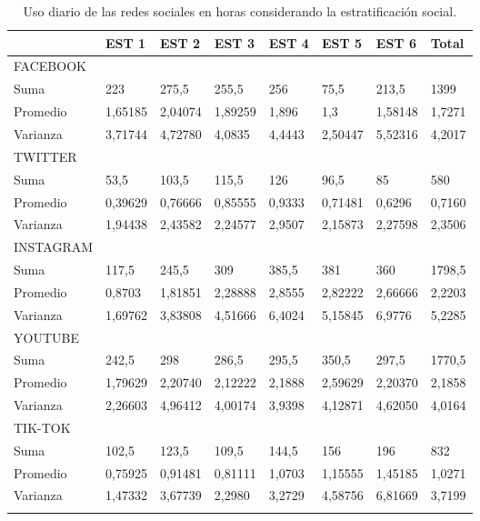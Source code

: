 \documentclass[spanish]{textolivre}
\begin{document}
\begin{table}[htpb]
\caption{Uso diario de las redes sociales en horas considerando la estratificación social.}
\label{tab3}
\centering
\begin{tabular}{llllllll}
\toprule 
& EST 1 & EST 2 & EST 3 & EST 4 & EST 5 & EST 6 & Total
\\ 
\midrule
FACEBOOK & & & & & &
\\
\arrayrulecolor[gray]{.7}
\midrule
Suma & 223 & 275,5 & 255,5 & 256 & 75,5 & 213,5 & 1399
\\
Promedio & 1,65185 & 2,04074 & 1,89259 & 1,896 & 1,3 & 1,58148 & 1,7271
\\
Varianza & 3,71744 & 4,72780 & 4,0835 & 4,4443 & 2,50447 & 5,52316 & 4,2017
\\
\arrayrulecolor{black}
\midrule
TWITTER & & & & & &
\\
\arrayrulecolor[gray]{.7}
\midrule
Suma & 53,5 & 103,5 & 115,5 & 126 & 96,5 & 85 & 580
\\
Promedio & 0,39629 & 0,76666 & 0,85555 & 0,9333 & 0,71481 & 0,6296 & 0,7160
\\
Varianza & 1,94438 & 2,43582 & 2,24577 & 2,9507 & 2,15873 & 2,27598 & 2,3506
\\
\arrayrulecolor{black}
\midrule
INSTAGRAM & & & & & &
\\
\arrayrulecolor[gray]{.7}
\midrule
Suma & 117,5 & 245,5 & 309 & 385,5 & 381 & 360 & 1798,5
\\
Promedio & 0,8703 & 1,81851 & 2,28888 & 2,8555 & 2,82222 & 2,66666 & 2,2203
\\
Varianza & 1,69762 & 3,83808 & 4,51666 & 6,4024 & 5,15845 & 6,9776 & 5,2285
\\
\arrayrulecolor{black}
\midrule
YOUTUBE & & & & & &
\\
\arrayrulecolor[gray]{.7}
\midrule
Suma & 242,5 & 298 & 286,5 & 295,5 & 350,5 & 297,5 & 1770,5
\\
Promedio & 1,79629 & 2,20740 & 2,12222 & 2,1888 & 2,59629 & 2,20370 & 2,1858
\\
Varianza & 2,26603 & 4,96412 & 4,00174 & 3,9398 &
4,12871 & 4,62050 & 4,0164
\\
\arrayrulecolor{black}
\midrule
TIK-TOK & & & & & &
\\
\arrayrulecolor[gray]{.7}
\midrule
Suma & 102,5 & 123,5 & 109,5 & 144,5 & 156 & 196 & 832
\\
Promedio & 0,75925 & 0,91481 & 0,81111 & 1,0703 & 1,15555 & 1,45185 & 1,0271
\\
Varianza & 1,47332 & 3,67739 & 2,2980 & 3,2729 & 4,58756 & 6,81669 & 3,7199
\\
\arrayrulecolor{black}
\bottomrule
\end{tabular}
\end{table}
\end{document}
